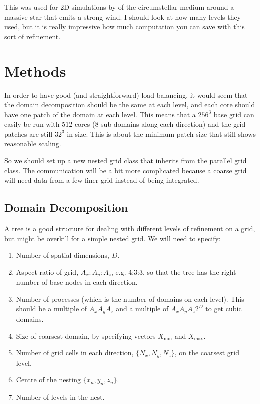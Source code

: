 \documentclass[a4paper,11pt]{article}
\begin{document}
This was used for 2D simulations by \citet{FreHenYor03, FreHenYor06} of the circumstellar medium around a massive star that emits a strong wind.
I should look at how many levels they used, but it is really impressive how much computation you can save with this sort of refinement.

\section{Methods}
In order to have good (and straightforward) load-balancing, it would seem that the domain decomposition should be the same at each level, and each core should have one patch of the domain at each level.
This means that a $256^3$ base grid can easily be run with 512 cores (8 sub-domains along each direction) and the grid patches are still $32^3$ in size.
This is about the minimum patch size that still shows reasonable scaling.

So we should set up a new nested grid class that inherits from the parallel grid class.
The communication will be a bit more complicated because a coarse grid will need data from a few finer grid instead of being integrated.


\subsection{Domain Decomposition}
A tree is a good structure for dealing with different levels of refinement on a grid, but might be overkill for a simple nested grid.
We will need to specify:
\begin{enumerate}
\item Number of spatial dimensions, $D$.
\item Aspect ratio of grid, $A_x:A_y:A_z$, e.g. 4:3:3, so that the tree has the right number of base nodes in each direction.
\item Number of processes (which is the number of domains on each level).
This should be a multiple of $A_xA_yA_z$ and a multiple of $A_xA_yA_z2^D$ to get cubic domains.
\item Size of coarsest domain, by specifying vectors $X_\mathrm{min}$ and $X_\mathrm{max}$.
\item Number of grid cells in each direction, $\{N_x,N_y,N_z\}$, on the coarsest grid level.
\item Centre of the nesting $\{x_n,y_n,z_n\}$.
\item Number of levels in the nest.
\end{enumerate}
\end{document}
